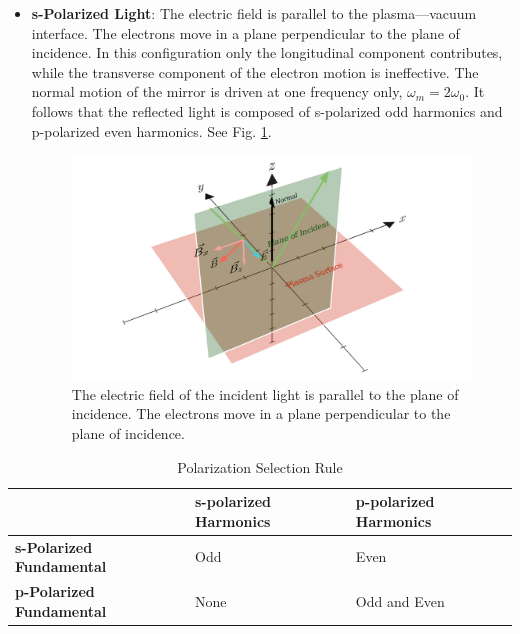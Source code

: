 \documentclass[12pt]{article}
\begin{document}
\begin{itemize}
    \item \textbf{s-Polarized Light}: The electric field is parallel to the plasma—vacuum interface. The electrons move in a plane perpendicular to the plane of incidence. In this configuration only the longitudinal component contributes, while the transverse component of the electron motion is ineffective. The normal motion of the mirror is driven at one frequency only, $\omega_m = 2\omega_0$. It follows that the reflected light is composed of s-polarized odd harmonics and p-polarized even harmonics. See Fig. \ref{fig:s-polarized}.
          \begin{figure}[h]
              \centering
              \includegraphics[width=1\textwidth]{images/s.png}
              \caption{The electric field of the incident light is parallel to the plane of incidence. The electrons move in a plane perpendicular to the plane of incidence.}
              \label{fig:s-polarized}
          \end{figure}
\end{itemize}
\begin{table}[h]
    \caption{Polarization Selection Rule}
    \vspace{0.5cm}
    \label{tab:selection-rule}
    \begin{tabular}{|l|l|l|}
        \hline
                                         & \textbf{s-polarized Harmonics} & \textbf{p-polarized Harmonics} \\ \hline
        \textbf{s-Polarized Fundamental} & Odd                            & Even                           \\ \hline
        \textbf{p-Polarized Fundamental} & None                           & Odd and Even                   \\ \hline
    \end{tabular}
\end{table}
\end{document}
